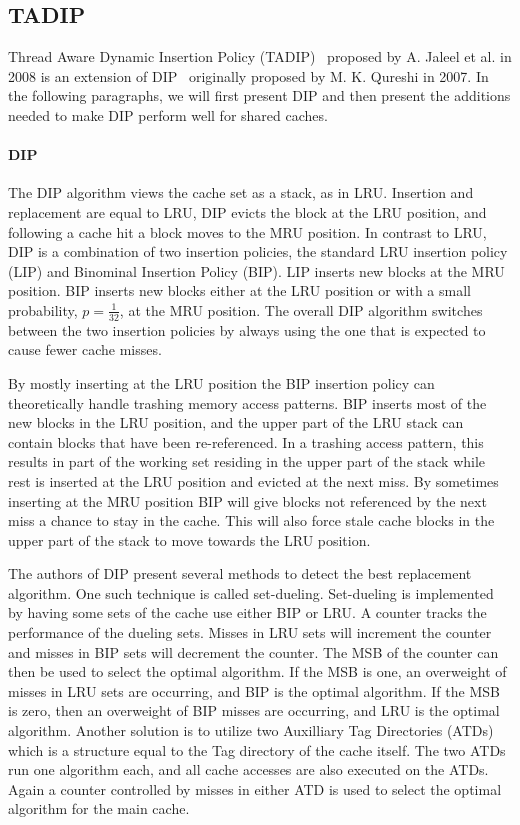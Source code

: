 \subsection{TADIP}
\label{sec:background:algorithms:tadip}

Thread Aware Dynamic Insertion Policy (TADIP)~\cite{Jaleel2008} proposed by A. Jaleel et al. in 2008 is an extension of DIP~\cite{Qureshi2007} originally proposed by M. K. Qureshi in 2007.
In the following paragraphs, we will first present DIP and then present the additions needed to make DIP perform well for shared caches.

\paragraph{DIP}

The DIP algorithm views the cache set as a stack, as in LRU.
Insertion and replacement are equal to LRU, DIP evicts the block at the LRU position, and following a cache hit a block moves to the MRU position.
In contrast to LRU, DIP is a combination of two insertion policies, the standard LRU insertion policy (LIP) and Binominal Insertion Policy (BIP).
LIP inserts new blocks at the MRU position.
BIP inserts new blocks either at the LRU position or with a small probability, $p = \frac{1}{32}$, at the MRU position. 
The overall DIP algorithm switches between the two insertion policies by always using the one that is expected to cause fewer cache misses.

By mostly inserting at the LRU position the BIP insertion policy can theoretically handle trashing memory access patterns.
BIP inserts most of the new blocks in the LRU position, and the upper part of the LRU stack can contain blocks that have been re-referenced.
In a trashing access pattern, this results in part of the working set residing in the upper part of the stack while rest is inserted at the LRU position and evicted at the next miss.
By sometimes inserting at the MRU position BIP will give blocks not referenced by the next miss a chance to stay in the cache. 
This will also force stale cache blocks in the upper part of the stack to move towards the LRU position.

The authors of DIP present several methods to detect the best replacement algorithm. 
One such technique is called set-dueling.
Set-dueling is implemented by having some sets of the cache use either BIP or LRU. 
A counter tracks the performance of the dueling sets.
Misses in LRU sets will increment the counter and misses in BIP sets will decrement the counter.
The MSB of the counter can then be used to select the optimal algorithm.
If the MSB is one, an overweight of misses in LRU sets are occurring, and BIP is the optimal algorithm. 
If the MSB is zero, then an overweight of BIP misses are occurring, and LRU is the optimal algorithm.
Another solution is to utilize two Auxilliary Tag Directories (ATDs) which is a structure equal to the Tag directory of the cache itself.
The two ATDs run one algorithm each, and all cache accesses are also executed on the ATDs.
Again a counter controlled by misses in either ATD is used to select the optimal algorithm for the main cache.

